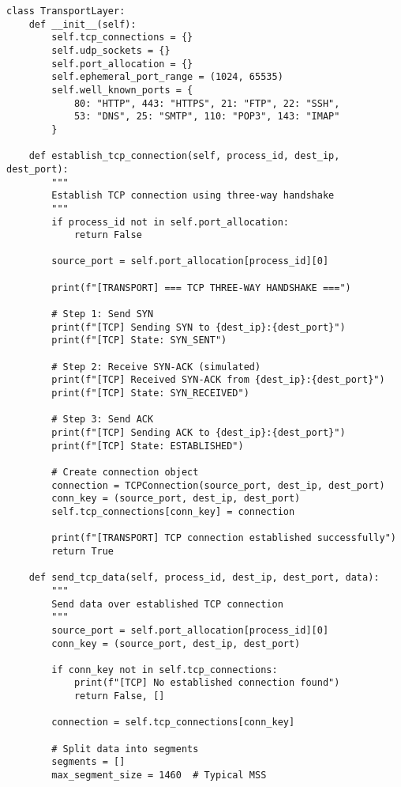 \documentclass[12pt,a4paper]{article}
\begin{document}
\begin{lstlisting}[caption=TCP Connection Management]
class TransportLayer:
    def __init__(self):
        self.tcp_connections = {}
        self.udp_sockets = {}
        self.port_allocation = {}
        self.ephemeral_port_range = (1024, 65535)
        self.well_known_ports = {
            80: "HTTP", 443: "HTTPS", 21: "FTP", 22: "SSH",
            53: "DNS", 25: "SMTP", 110: "POP3", 143: "IMAP"
        }
    
    def establish_tcp_connection(self, process_id, dest_ip, dest_port):
        """
        Establish TCP connection using three-way handshake
        """
        if process_id not in self.port_allocation:
            return False
        
        source_port = self.port_allocation[process_id][0]
        
        print(f"[TRANSPORT] === TCP THREE-WAY HANDSHAKE ===")
        
        # Step 1: Send SYN
        print(f"[TCP] Sending SYN to {dest_ip}:{dest_port}")
        print(f"[TCP] State: SYN_SENT")
        
        # Step 2: Receive SYN-ACK (simulated)
        print(f"[TCP] Received SYN-ACK from {dest_ip}:{dest_port}")
        print(f"[TCP] State: SYN_RECEIVED")
        
        # Step 3: Send ACK
        print(f"[TCP] Sending ACK to {dest_ip}:{dest_port}")
        print(f"[TCP] State: ESTABLISHED")
        
        # Create connection object
        connection = TCPConnection(source_port, dest_ip, dest_port)
        conn_key = (source_port, dest_ip, dest_port)
        self.tcp_connections[conn_key] = connection
        
        print(f"[TRANSPORT] TCP connection established successfully")
        return True
    
    def send_tcp_data(self, process_id, dest_ip, dest_port, data):
        """
        Send data over established TCP connection
        """
        source_port = self.port_allocation[process_id][0]
        conn_key = (source_port, dest_ip, dest_port)
        
        if conn_key not in self.tcp_connections:
            print(f"[TCP] No established connection found")
            return False, []
        
        connection = self.tcp_connections[conn_key]
        
        # Split data into segments
        segments = []
        max_segment_size = 1460  # Typical MSS
        

\end{lstlisting}
\end{document}
